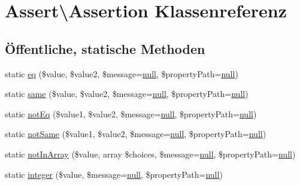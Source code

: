 \hypertarget{class_assert_1_1_assertion}{}\section{Assert\textbackslash{}Assertion Klassenreferenz}
\label{class_assert_1_1_assertion}
\subsection*{Öffentliche, statische Methoden}
\begin{DoxyCompactItemize}
\item 
static \mbox{\hyperlink{class_assert_1_1_assertion_a161c6f74888e4b6f7bf4a23bbb9cf821}{eq}} (\$value, \$value2, \$message=\mbox{\hyperlink{class_assert_1_1_assertion_af95d8b1582dd619cc0159041bc6892c5}{null}}, \$property\+Path=\mbox{\hyperlink{class_assert_1_1_assertion_af95d8b1582dd619cc0159041bc6892c5}{null}})
\item 
static \mbox{\hyperlink{class_assert_1_1_assertion_a53a32e11c8b74b9c1864333607dd7e85}{same}} (\$value, \$value2, \$message=\mbox{\hyperlink{class_assert_1_1_assertion_af95d8b1582dd619cc0159041bc6892c5}{null}}, \$property\+Path=\mbox{\hyperlink{class_assert_1_1_assertion_af95d8b1582dd619cc0159041bc6892c5}{null}})
\item 
static \mbox{\hyperlink{class_assert_1_1_assertion_a712d9e8a156a38a47f709bb544303435}{not\+Eq}} (\$value1, \$value2, \$message=\mbox{\hyperlink{class_assert_1_1_assertion_af95d8b1582dd619cc0159041bc6892c5}{null}}, \$property\+Path=\mbox{\hyperlink{class_assert_1_1_assertion_af95d8b1582dd619cc0159041bc6892c5}{null}})
\item 
static \mbox{\hyperlink{class_assert_1_1_assertion_aa59435aa1362517f0e92e2131582789a}{not\+Same}} (\$value1, \$value2, \$message=\mbox{\hyperlink{class_assert_1_1_assertion_af95d8b1582dd619cc0159041bc6892c5}{null}}, \$property\+Path=\mbox{\hyperlink{class_assert_1_1_assertion_af95d8b1582dd619cc0159041bc6892c5}{null}})
\item 
static \mbox{\hyperlink{class_assert_1_1_assertion_ac0b794943b6e98f6e7b3acedb0265c3b}{not\+In\+Array}} (\$value, array \$choices, \$message=\mbox{\hyperlink{class_assert_1_1_assertion_af95d8b1582dd619cc0159041bc6892c5}{null}}, \$property\+Path=\mbox{\hyperlink{class_assert_1_1_assertion_af95d8b1582dd619cc0159041bc6892c5}{null}})
\item 
static \mbox{\hyperlink{class_assert_1_1_assertion_a7c8124f65768630a31a5c8207be85ab1}{integer}} (\$value, \$message=\mbox{\hyperlink{class_assert_1_1_assertion_af95d8b1582dd619cc0159041bc6892c5}{null}}, \$property\+Path=\mbox{\hyperlink{class_assert_1_1_assertion_af95d8b1582dd619cc0159041bc6892c5}{null}})

\end{DoxyCompactItemize}

